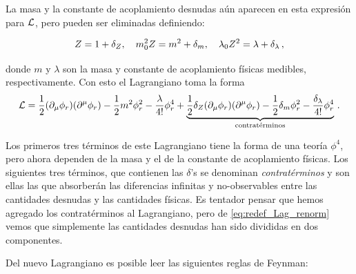 La masa y la constante de acoplamiento desnudas aún aparecen en esta expresión para $\mathcal{L}$, pero pueden ser eliminadas definiendo:

%
\begin{equation}
	Z = 1 + \delta_Z \qc m_0^2Z = m^2 + \delta_m \qc \lambda_0 Z^2 = \lambda + \delta_\lambda \,,
	\label{eq:redef_Lag_renorm}
\end{equation}

\noindent donde $m$ y $\lambda$ son la masa y constante de acoplamiento físicas medibles, respectivamente. Con esto el Lagrangiano toma la forma
%
\begin{equation}
	\mathcal{L} = \frac{1}{2} \qty(\partial_\mu\phi_r)\qty(\partial^\mu\phi_r) - \frac{1}{2} m^2 \phi_r^2 - \frac{\lambda}{4!} \phi_r^4 + \underbrace{\frac{1}{2} \delta_Z \qty(\partial_\mu\phi_r)\qty(\partial^\mu\phi_r) - \frac{1}{2} \delta_m \phi_r^2 - \frac{\delta_\lambda}{4!} \phi_r^4}_{\text{contratérminos}} \,.
\end{equation}

Los primeros tres términos de este Lagrangiano tiene la forma de una teoría $\phi^4$, pero ahora dependen de la masa y el de la constante de acoplamiento físicas. Los siguientes tres términos, que contienen las $\delta$'s se denominan \emph{contratérminos} y son ellas las que absorberán las diferencias infinitas y no-observables entre las cantidades desnudas y las cantidades físicas. Es tentador pensar que hemos agregado los contratérminos al Lagrangiano, pero de \eqref{eq:redef_Lag_renorm} vemos que simplemente las cantidades desnudas han sido divididas en dos componentes.

Del nuevo Lagrangiano es posible leer las siguientes reglas de Feynman:

